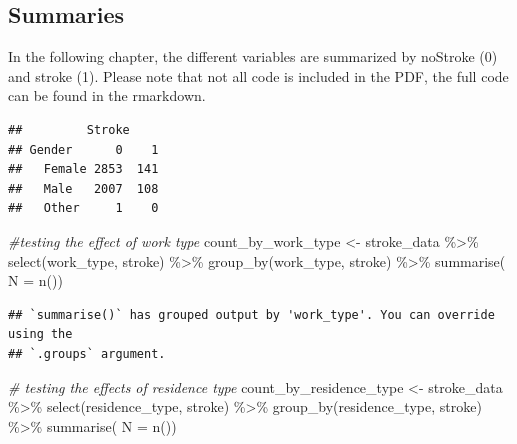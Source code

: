 \documentclass[
]{article}
\newenvironment{Shaded}{\begin{snugshade}}{\end{snugshade}}
\newcommand{\AttributeTok}[1]{\textcolor[rgb]{0.77,0.63,0.00}{#1}}
\newcommand{\CommentTok}[1]{\textcolor[rgb]{0.56,0.35,0.01}{\textit{#1}}}
\newcommand{\FunctionTok}[1]{\textcolor[rgb]{0.00,0.00,0.00}{#1}}
\newcommand{\NormalTok}[1]{#1}
\newcommand{\OtherTok}[1]{\textcolor[rgb]{0.56,0.35,0.01}{#1}}
\newcommand{\SpecialCharTok}[1]{\textcolor[rgb]{0.00,0.00,0.00}{#1}}
\newcommand{\StringTok}[1]{\textcolor[rgb]{0.31,0.60,0.02}{#1}}
\renewcommand{\=}[1]{\stackrel{#1}{=}}
\theoremstyle{definition}
\theoremstyle{remark}
\begin{document}
\hypertarget{summaries}{%
\subsection{Summaries}\label{summaries}}

In the following chapter, the different variables are summarized by noStroke (0) and stroke (1). Please note that not all code is included in the PDF, the full code can be found in the rmarkdown.

\begin{Shaded}
\end{Shaded}

\begin{verbatim}
##         Stroke
## Gender      0    1
##   Female 2853  141
##   Male   2007  108
##   Other     1    0
\end{verbatim}

\begin{Shaded}
\begin{Highlighting}[]
\CommentTok{\#testing the effect of work type}
\NormalTok{ count\_by\_work\_type }\OtherTok{\textless{}{-}}\NormalTok{ stroke\_data }\SpecialCharTok{\%\textgreater{}\%} 
   \FunctionTok{select}\NormalTok{(work\_type, stroke) }\SpecialCharTok{\%\textgreater{}\%} 
   \FunctionTok{group\_by}\NormalTok{(work\_type, stroke) }\SpecialCharTok{\%\textgreater{}\%}
   \FunctionTok{summarise}\NormalTok{( }\AttributeTok{N =} \FunctionTok{n}\NormalTok{())}
\end{Highlighting}
\end{Shaded}

\begin{verbatim}
## `summarise()` has grouped output by 'work_type'. You can override using the
## `.groups` argument.
\end{verbatim}

\begin{Shaded}
\begin{Highlighting}[]
 \CommentTok{\# testing the effects of residence type}
\NormalTok{count\_by\_residence\_type }\OtherTok{\textless{}{-}}\NormalTok{ stroke\_data }\SpecialCharTok{\%\textgreater{}\%} 
   \FunctionTok{select}\NormalTok{(residence\_type, stroke) }\SpecialCharTok{\%\textgreater{}\%} 
   \FunctionTok{group\_by}\NormalTok{(residence\_type, stroke) }\SpecialCharTok{\%\textgreater{}\%}
   \FunctionTok{summarise}\NormalTok{( }\AttributeTok{N =} \FunctionTok{n}\NormalTok{())}
\end{Highlighting}
\end{Shaded}
\end{document}
